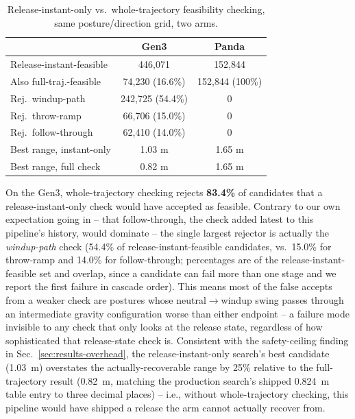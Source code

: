 \documentclass[conference]{IEEEtran}
\begin{document}
\begin{table}[t]
\centering
\small
\caption{Release-instant-only vs.\ whole-trajectory feasibility checking,
same posture/direction grid, two arms.}
\label{tab:ablation}
\begin{tabular}{@{}lcc@{}}
\toprule
 & Gen3 & Panda \\
\midrule
Release-instant-feasible & 446{,}071 & 152{,}844 \\
Also full-traj.-feasible & 74{,}230 (16.6\%) & 152{,}844 (100\%) \\
Rej.\ windup-path & 242{,}725 (54.4\%) & 0 \\
Rej.\ throw-ramp & 66{,}706 (15.0\%) & 0 \\
Rej.\ follow-through & 62{,}410 (14.0\%) & 0 \\
Best range, instant-only & 1.03 m & 1.65 m \\
Best range, full check & 0.82 m & 1.65 m \\
\bottomrule
\end{tabular}
\end{table}

On the Gen3, whole-trajectory checking rejects \textbf{83.4\%} of candidates
that a release-instant-only check would have accepted as feasible.
Contrary to our own expectation going in -- that follow-through, the check
added latest to this pipeline's history, would dominate -- the single
largest rejector is actually the \emph{windup-path} check (54.4\% of
release-instant-feasible candidates, vs.\ 15.0\% for throw-ramp and 14.0\%
for follow-through; percentages are of the release-instant-feasible set and
overlap, since a candidate can fail more than one stage and we report the
first failure in cascade order). This means most of the false accepts from
a weaker check are postures whose neutral$\to$windup swing passes through
an intermediate gravity configuration worse than either endpoint -- a
failure mode invisible to any check that only looks at the release state,
regardless of how sophisticated that release-state check is. Consistent
with the safety-ceiling finding in Sec.~\ref{sec:results-overhead}, the
release-instant-only search's best candidate (1.03~m) overstates the
actually-recoverable range by 25\% relative to the full-trajectory result
(0.82~m, matching the production search's shipped 0.824~m table entry to
three decimal places) -- i.e., without whole-trajectory checking, this
pipeline would have shipped a release the arm cannot actually recover
from.
\end{document}
